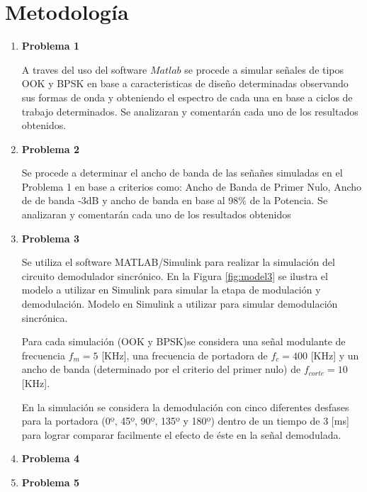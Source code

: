 \documentclass[letterpaper, titlepage]{article}
\begin{document}
\section{Metodología}
	\begin{enumerate}
		\item \textbf{Problema 1}
		
		A traves del uso del software $Matlab$ se procede a simular señales de tipos OOK y BPSK en base a caracteristicas de diseño determinadas observando sus formas de onda y obteniendo el espectro de cada una en base a ciclos de trabajo determinados. Se  analizaran y comentarán cada uno de  los resultados obtenidos.
		\item \textbf{Problema 2}
		
		Se procede a determinar el ancho de banda de las señañes simuladas en el Problema 1 en base a criterios como: Ancho de Banda de Primer Nulo, Ancho de de banda -3dB y ancho de banda en base al 98\% de la Potencia. Se  analizaran y comentarán cada uno de  los resultados obtenidos
		\item \textbf{Problema 3}
		
			Se utiliza el software MATLAB/Simulink para realizar la simulación del circuito demodulador sincrónico. En la Figura \ref{fig:model3} se ilustra el modelo a utilizar en Simulink para simular la etapa de modulación y demodulación.
			{Modelo en Simulink a utilizar para simular demodulación sincrónica.}
			
			Para cada simulación (OOK y BPSK)se considera una señal modulante de frecuencia $f_m=5$ [KHz], una frecuencia de portadora de $f_c=400$ [KHz] y un ancho de banda (determinado por el criterio del primer nulo) de $f_{corte}=10$ [KHz].
			
			En la simulación se considera la demodulación con cinco diferentes desfases para la portadora (0º, 45º, 90º, 135º y 180º) dentro de un tiempo de $3$ [ms] para lograr comparar facilmente el efecto de éste en la señal demodulada.
			
		\item \textbf{Problema 4}
		
		\item \textbf{Problema 5}
	\end{enumerate}
\newpage
\newpage
\end{document}
